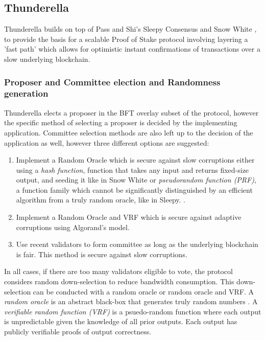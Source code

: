 \documentclass[10pt,journal,compsoc]{IEEEtran}
\begin{document}
\subsection{Thunderella}
Thunderella \cite{Thunderella} builds on top of Pass and Shi's Sleepy Consensus \cite{Sleepy} and Snow White \cite{SnowWhite}, to provide the basis for a scalable
 Proof of Stake protocol involving layering a 'fast path' which allows for optimistic instant confirmations of transactions over a slow underlying blockchain. 

\subsubsection{Proposer and Committee election and Randomness generation}

Thunderella elects a proposer in the BFT overlay subset of the protocol, however the specific method of selecting a proposer is decided by the implementing application. Committee selection methods are also left up to the decision of the application as well, however three different options are suggested:
\begin{enumerate} \item Implement a Random Oracle which is secure against slow corruptions either using a \emph{hash function}, function that takes any input and returns fixed-size output, \indent and seeding it like in Snow White
\cite{SnowWhite} or  \emph{pseudorandom function (PRF)}, a function family which cannot be significantly distinguished by an efficient algorithm from a truly random oracle, like in Sleepy. \cite{Sleepy}.
\item Implement a Random Oracle and VRF which is secure \indent against adaptive corruptions using Algorand's model.
\item Use recent validators to form committee as long as the underlying blockchain is fair. This method is secure against slow corruptions.
\end{enumerate}

In all cases, if there are too many validators eligible to vote, the protocol considers random down-selection to reduce bandwidth consumption. This down-selection can be conducted with a random oracle or random oracle and VRF.
A \emph{random oracle} is an abstract black-box that generates truly random numbers \cite{Mahnush}. A \emph{verifiable random function (VRF)} is a psuedo-random function where each output is unpredictable given the knowledge of all prior outputs. Each output has publicly verifiable proofs of output correctness. \cite{MicaliEtAl} 
\end{document}
